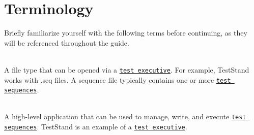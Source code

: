 \chapter{Terminology }
\hypertarget{terms}{}\label{terms}
Briefly familiarize yourself with the following terms before continuing, as they will be referenced throughout the guide.


\begin{DoxyDescription}
\item[{\parbox[t]{\linewidth}{{\bfseries{\label{terms_term_sequence_file}%
\Hypertarget{terms_term_sequence_file}%
Sequence File}} }}]\hfill \\
A file type that can be opened via a \href{\#term_test_executive}{\texttt{test executive}}. For example, Test\+Stand works with .seq files. A sequence file typically contains one or more \href{\#term_sequence}{\texttt{test sequences}}. 


\item[{\parbox[t]{\linewidth}{{\bfseries{\label{terms_term_test_executive}%
\Hypertarget{terms_term_test_executive}%
Test Executive}} }}]\hfill \\
A high-\/level application that can be used to manage, write, and execute \href{\#term_sequence}{\texttt{test sequences}}. Test\+Stand is an example of a \href{\#term_test_executive}{\texttt{test executive}}.  
\end{DoxyDescription}